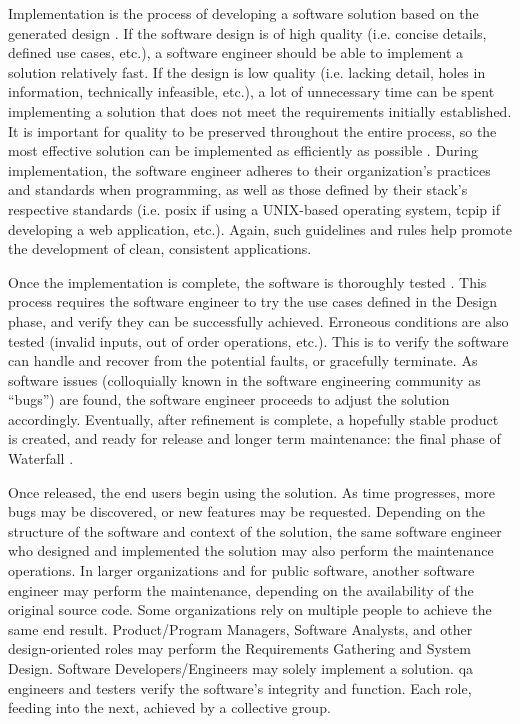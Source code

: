     \par Implementation is the process of developing a software solution based on the generated design \cite{Sommerville2011}. If the software design is of high quality (i.e. concise details, defined use cases, etc.), a software engineer should be able to implement a solution relatively fast. If the design is low quality (i.e. lacking detail, holes in information, technically infeasible, etc.), a lot of unnecessary time can be spent implementing a solution that does not meet the requirements initially established. It is important for quality to be preserved throughout the entire process, so the most effective solution can be implemented as efficiently as possible \cite{Sommerville2011}. During implementation, the software engineer adheres to their organization's practices and standards when programming, as well as those defined by their stack's respective standards (i.e. \gls{posix} if using a UNIX-based operating system, \gls{tcpip} if developing a web application, etc.). Again, such guidelines and rules help promote the development of clean, consistent applications.

    \par Once the implementation is complete, the software is thoroughly tested \cite{Sommerville2011}. This process requires the software engineer to try the use cases defined in the Design phase, and verify they can be successfully achieved. Erroneous conditions are also tested (invalid inputs, out of order operations, etc.). This is to verify the software can handle and recover from the potential faults, or gracefully terminate. As software issues (colloquially known in the software engineering community as ``bugs'') are found, the software engineer proceeds to adjust the solution accordingly. Eventually, after refinement is complete, a hopefully stable product is created, and ready for release and longer term maintenance: the final phase of Waterfall \cite{Sommerville2011}.

    \par Once released, the end users begin using the solution. As time progresses, more bugs may be discovered, or new features may be requested. Depending on the structure of the software and context of the solution, the same software engineer who designed and implemented the solution may also perform the maintenance operations. In larger organizations and for public software, another software engineer may perform the maintenance, depending on the availability of the original source code. Some organizations rely on multiple people to achieve the same end result. Product/Program Managers, Software Analysts, and other design-oriented roles may perform the Requirements Gathering and System Design. Software Developers/Engineers may solely implement a solution. \gls{qa} engineers and testers verify the software's integrity and function. Each role, feeding into the next, achieved by a collective group.

